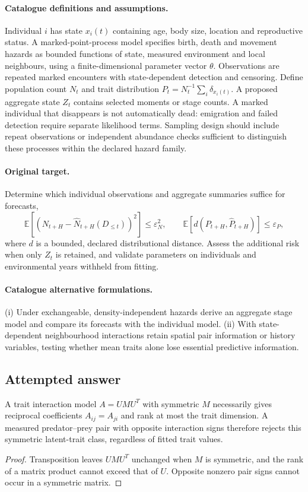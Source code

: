 \documentclass[11pt]{article}
\begin{document}
\paragraph{Catalogue definitions and assumptions.}
Individual $i$ has state $x_i(t)$ containing age, body size, location and reproductive status. A marked-point-process model specifies birth, death and movement hazards as bounded functions of state, measured environment and local neighbours, using a finite-dimensional parameter vector $\theta$. Observations are repeated marked encounters with state-dependent detection and censoring. Define population count $N_t$ and trait distribution $P_t=N_t^{-1}\sum_i\delta_{x_i(t)}$. A proposed aggregate state $Z_t$ contains selected moments or stage counts. A marked individual that disappears is not automatically dead: emigration and failed detection require separate likelihood terms. Sampling design should include repeat observations or independent abundance checks sufficient to distinguish these processes within the declared hazard family.
\paragraph{Original target.}
Determine which individual observations and aggregate summaries suffice for forecasts,
\[
 \mathbb{E}[(N_{t+H}-\widehat N_{t+H}(D_{\le t}))^2]\le\varepsilon_N^2,
 \qquad
 \mathbb{E}[d(P_{t+H},\widehat P_{t+H})]\le\varepsilon_P,
\]
where $d$ is a bounded, declared distributional distance. Assess the additional risk when only $Z_t$ is retained, and validate parameters on individuals and environmental years withheld from fitting.
\paragraph{Catalogue alternative formulations.}
(i) Under exchangeable, density-independent hazards derive an aggregate stage model and compare its forecasts with the individual model. (ii) With state-dependent neighbourhood interactions retain spatial pair information or history variables, testing whether mean traits alone lose essential predictive information.
\subsection{Attempted answer}
\begin{proposition}
A trait interaction model $A=UMU^T$ with symmetric $M$ necessarily gives reciprocal coefficients $A_{ij}=A_{ji}$ and rank at most the trait dimension. A measured predator--prey pair with opposite interaction signs therefore rejects this symmetric latent-trait class, regardless of fitted trait values.
\end{proposition}
\begin{proof}
Transposition leaves $UMU^T$ unchanged when $M$ is symmetric, and the rank of a matrix product cannot exceed that of $U$. Opposite nonzero pair signs cannot occur in a symmetric matrix.
\end{proof}
\end{document}
